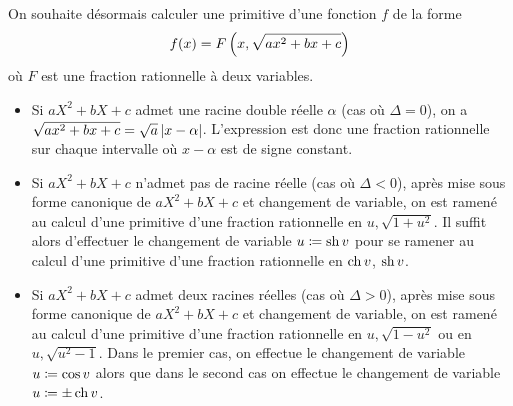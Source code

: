 \documentclass{magnolia}
\begin{document}
On souhaite désormais calculer une primitive d'une fonction $f$ de la forme
  \[f(x)=F\left(x,\sqrt{ax^2+bx+c}\right)\]
  où $F$ est une fraction rationnelle à deux variables.
  \begin{itemize}
  \item Si $aX^2+bX+c$ admet une racine double réelle $\alpha$ (cas où $\Delta=0$), on
    a $\sqrt{ax^2+bx+c}=\sqrt{a}\left|x-\alpha\right|$. L'expression est donc
    une fraction rationnelle sur chaque intervalle où $x-\alpha$ est de signe
    constant.
  \item Si $aX^2+bX+c$ n'admet pas de racine réelle (cas où $\Delta<0$), après
    mise sous forme canonique de $aX^2+bX+c$ et changement de variable, on
    est ramené au calcul d'une primitive d'une fraction rationnelle
    en $u,\sqrt{1+u^2}$. Il suffit alors d'effectuer le changement de variable
    $u\coloneqq\operatorname{sh} v$ pour se ramener au calcul d'une primitive d'une fraction
    rationnelle en $\operatorname{ch} v$, $\operatorname{sh} v$.
  \item Si $aX^2+bX+c$ admet deux racines réelles (cas où $\Delta>0$), après
    mise sous forme canonique de $aX^2+bX+c$ et changement de variable, on
    est ramené au calcul d'une primitive d'une fraction rationnelle
    en $u,\sqrt{1-u^2}$ ou en $u,\sqrt{u^2-1}$. Dans le premier cas, on
    effectue le changement de variable $u\coloneqq\cos v$ alors que dans le second
    cas on effectue le changement de variable $u\coloneqq\pm\operatorname{ch} v$.
  \end{itemize}
\end{document}
